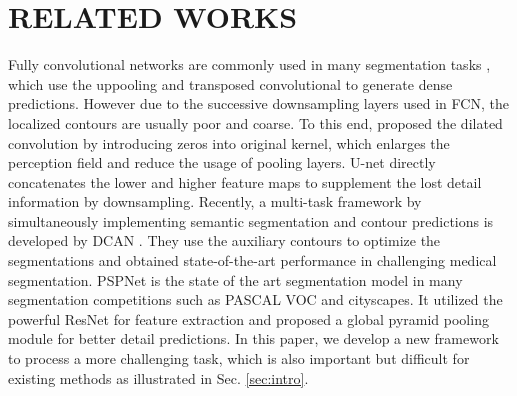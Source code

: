 \section{RELATED WORKS}
Fully convolutional networks are commonly used in many segmentation tasks \cite{Long2015,Badrinarayanan2015,Noh2015,Ronneberger2015,Chen2016a,Chen2017,Zhao2016}, which use the uppooling \cite{Badrinarayanan2015} and transposed convolutional \cite{Noh2015} to generate dense predictions.
However due to the successive downsampling layers used in FCN, the localized contours are usually poor and coarse.
To this end, \cite{Chen2016a} proposed the dilated convolution by introducing zeros into original kernel, which enlarges the perception field and reduce the usage of pooling layers.
U-net \cite{Ronneberger2015} directly concatenates the lower and higher feature maps to supplement the lost detail information by downsampling.
Recently, a multi-task framework by simultaneously implementing semantic segmentation and contour predictions is developed by DCAN \cite{Chen2017}.
They use the auxiliary contours to optimize the segmentations and obtained state-of-the-art performance in challenging medical segmentation. 
PSPNet \cite{Zhao2016} is the state of the art segmentation model in many segmentation competitions such as PASCAL VOC and cityscapes.
It utilized the powerful ResNet \cite{He2016} for feature extraction and proposed a global pyramid pooling module for better detail predictions.
In this paper, we develop a new framework to process a more challenging task, which is also important but difficult for existing methods as illustrated in Sec. \ref{sec:intro}. 